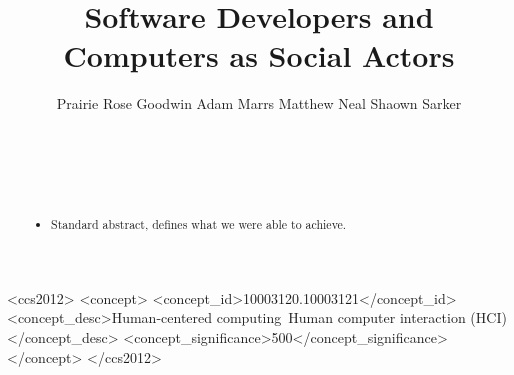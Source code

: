 \documentclass{sig-alternate-05-2015}
\begin{document}


\doi{}

\isbn{}


%

\title{Software Developers and Computers as Social Actors}
%

%
\author{Prairie Rose Goodwin \qquad Adam Marrs \qquad Matthew Neal \qquad Shaown Sarker\\ \\ \\ \\ \\}


\maketitle
\begin{abstract}
\begin{itemize}
    \item Standard abstract, defines what we were able to achieve.
\end{itemize}
\end{abstract}


%
%
\begin{CCSXML}
<ccs2012>
<concept>
<concept_id>10003120.10003121</concept_id>
<concept_desc>Human-centered computing~Human computer interaction (HCI)</concept_desc>
<concept_significance>500</concept_significance>
</concept>
</ccs2012>
\end{CCSXML}
\end{document}
